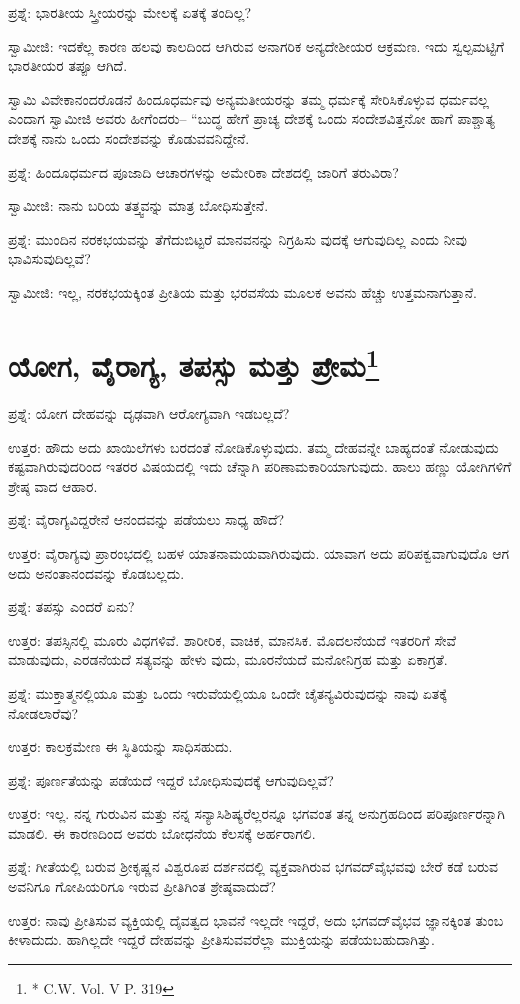 ಪ್ರಶ್ನೆ: ಭಾರತೀಯ ಸ್ತ್ರೀಯರನ್ನು ಮೇಲಕ್ಕೆ ಏತಕ್ಕೆ ತಂದಿಲ್ಲ?

ಸ್ವಾಮೀಜಿ: ಇದಕೆಲ್ಲ ಕಾರಣ ಹಲವು ಕಾಲದಿಂದ ಆಗಿರುವ ಅನಾಗರಿಕ ಅನ್ಯದೇಶೀಯರ ಆಕ್ರಮಣ. ಇದು ಸ್ವಲ್ಪಮಟ್ಟಿಗೆ ಭಾರತೀಯರ ತಪ್ಪೂ ಆಗಿದೆ.

ಸ್ವಾಮಿ ವಿವೇಕಾನಂದರೊಡನೆ ಹಿಂದೂಧರ್ಮವು ಅನ್ಯಮತೀಯರನ್ನು ತಮ್ಮ ಧರ್ಮಕ್ಕೆ ಸೇರಿಸಿಕೊಳ್ಳುವ ಧರ್ಮವಲ್ಲ ಎಂದಾಗ ಸ್ವಾಮೀಜಿ ಅವರು ಹೀಗೆಂದರು– “ಬುದ್ಧ ಹೇಗೆ ಪ್ರಾಚ್ಯ ದೇಶಕ್ಕೆ ಒಂದು ಸಂದೇಶವಿತ್ತನೋ ಹಾಗೆ ಪಾಶ್ಚಾತ್ಯ ದೇಶಕ್ಕೆ ನಾನು ಒಂದು ಸಂದೇಶವನ್ನು ಕೊಡುವವನಿದ್ದೇನೆ.

ಪ್ರಶ್ನೆ: ಹಿಂದೂಧರ್ಮದ ಪೂಜಾದಿ ಆಚಾರಗಳನ್ನು ಅಮೇರಿಕಾ ದೇಶದಲ್ಲಿ ಜಾರಿಗೆ ತರುವಿರಾ?

ಸ್ವಾಮೀಜಿ: ನಾನು ಬರಿಯ ತತ್ತ್ವವನ್ನು ಮಾತ್ರ ಬೋಧಿಸುತ್ತೇನೆ.

ಪ್ರಶ್ನೆ: ಮುಂದಿನ ನರಕಭಯವನ್ನು ತೆಗೆದುಬಿಟ್ಟರೆ ಮಾನವನನ್ನು ನಿಗ್ರಹಿಸು ವುದಕ್ಕೆ ಆಗುವುದಿಲ್ಲ ಎಂದು ನೀವು ಭಾವಿಸುವುದಿಲ್ಲವೆ?

ಸ್ವಾಮೀಜಿ: ಇಲ್ಲ, ನರಕಭಯಕ್ಕಿಂತ ಪ್ರೀತಿಯ ಮತ್ತು ಭರವಸೆಯ ಮೂಲಕ ಅವನು ಹೆಚ್ಚು ಉತ್ತಮನಾಗುತ್ತಾನೆ.


\section{ಯೋಗ, ವೈರಾಗ್ಯ, ತಪಸ್ಸು ಮತ್ತು ಪ್ರೇಮ\protect\footnote{* C.W. Vol. V P. 319}}

ಪ್ರಶ್ನೆ: ಯೋಗ ದೇಹವನ್ನು ದೃಢವಾಗಿ ಆರೋಗ್ಯವಾಗಿ ಇಡಬಲ್ಲದೆ?

ಉತ್ತರ: ಹೌದು ಅದು ಖಾಯಿಲೆಗಳು ಬರದಂತೆ ನೋಡಿಕೊಳ್ಳುವುದು. ತಮ್ಮ ದೇಹವನ್ನೇ ಬಾಹ್ಯದಂತೆ ನೋಡುವುದು ಕಷ್ಟವಾಗಿರುವುದರಿಂದ ಇತರರ ವಿಷಯದಲ್ಲಿ ಇದು ಚೆನ್ನಾಗಿ ಪರಿಣಾಮಕಾರಿಯಾಗುವುದು. ಹಾಲು ಹಣ್ಣು ಯೋಗಿಗಳಿಗೆ ಶ್ರೇಷ್ಠ ವಾದ ಆಹಾರ.

ಪ್ರಶ್ನೆ: ವೈರಾಗ್ಯವಿದ್ದರೇನೆ ಆನಂದವನ್ನು ಪಡೆಯಲು ಸಾಧ್ಯ ಹೌದೆ?

ಉತ್ತರ: ವೈರಾಗ್ಯವು ಪ್ರಾರಂಭದಲ್ಲಿ ಬಹಳ ಯಾತನಾಮಯವಾಗಿರುವುದು. ಯಾವಾಗ ಅದು ಪರಿಪಕ್ವವಾಗುವುದೊ ಆಗ ಅದು ಅನಂತಾನಂದವನ್ನು ಕೊಡಬಲ್ಲದು.

ಪ್ರಶ್ನೆ: ತಪಸ್ಸು ಎಂದರೆ ಏನು?

ಉತ್ತರ: ತಪಸ್ಸಿನಲ್ಲಿ ಮೂರು ವಿಧಗಳಿವೆ. ಶಾರೀರಿಕ, ವಾಚಿಕ, ಮಾನಸಿಕ. ಮೊದಲನೆಯದೆ ಇತರರಿಗೆ ಸೇವೆ ಮಾಡುವುದು, ಎರಡನೆಯದೆ ಸತ್ಯವನ್ನು ಹೇಳು ವುದು, ಮೂರನೆಯದೆ ಮನೋನಿಗ್ರಹ ಮತ್ತು ಏಕಾಗ್ರತೆ.

ಪ್ರಶ್ನೆ: ಮುಕ್ತಾತ್ಮನಲ್ಲಿಯೂ ಮತ್ತು ಒಂದು ಇರುವೆಯಲ್ಲಿಯೂ ಒಂದೇ ಚೈತನ್ಯವಿರುವುದನ್ನು ನಾವು ಏತಕ್ಕೆ ನೋಡಲಾರೆವು?

ಉತ್ತರ: ಕಾಲಕ್ರಮೇಣ ಈ ಸ್ಥಿತಿಯನ್ನು ಸಾಧಿಸಹುದು.

ಪ್ರಶ್ನೆ: ಪೂರ್ಣತೆಯನ್ನು ಪಡೆಯದೆ ಇದ್ದರೆ ಬೋಧಿಸುವುದಕ್ಕೆ ಆಗುವುದಿಲ್ಲವೆ?

ಉತ್ತರ: ಇಲ್ಲ. ನನ್ನ ಗುರುವಿನ ಮತ್ತು ನನ್ನ ಸನ್ಯಾಸಿಶಿಷ್ಯರೆಲ್ಲರನ್ನೂ ಭಗವಂತ ತನ್ನ ಅನುಗ್ರಹದಿಂದ ಪರಿಪೂರ್ಣರನ್ನಾಗಿ ಮಾಡಲಿ. ಈ ಕಾರಣದಿಂದ ಅವರು ಬೋಧನೆಯ ಕೆಲಸಕ್ಕೆ ಅರ್ಹರಾಗಲಿ.

ಪ್ರಶ್ನೆ: ಗೀತೆಯಲ್ಲಿ ಬರುವ ಶ‍್ರೀಕೃಷ್ಣನ ವಿಶ್ವರೂಪ ದರ್ಶನದಲ್ಲಿ ವ್ಯಕ್ತವಾಗಿರುವ ಭಗವದ್​ವೈಭವವು ಬೇರೆ ಕಡೆ ಬರುವ ಅವನಿಗೂ ಗೋಪಿಯರಿಗೂ ಇರುವ ಪ್ರೀತಿಗಿಂತ ಶ್ರೇಷ್ಠವಾದುದೆ?

ಉತ್ತರ: ನಾವು ಪ್ರೀತಿಸುವ ವ್ಯಕ್ತಿಯಲ್ಲಿ ದೈವತ್ವದ ಭಾವನೆ ಇಲ್ಲದೇ ಇದ್ದರೆ, ಅದು ಭಗವದ್​ವೈಭವ ಜ್ಞಾನಕ್ಕಿಂತ ತುಂಬ ಕೀಳಾದುದು. ಹಾಗಿಲ್ಲದೇ ಇದ್ದರೆ ದೇಹವನ್ನು ಪ್ರೀತಿಸುವವರೆಲ್ಲಾ ಮುಕ್ತಿಯನ್ನು ಪಡೆಯಬಹುದಾಗಿತ್ತು.

